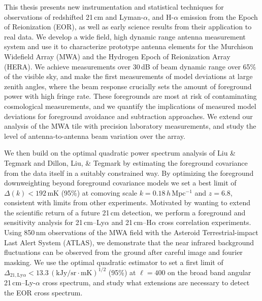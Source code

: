 % 
% 
%

This thesis presents new instrumentation and statistical techniques for observations of redshifted 21\,cm and Lyman-$\alpha$, and H-$\alpha$  emission from the Epoch of Reionization (EOR), as well as early science results from their application to real data. We develop a wide field, high dynamic range antenna measurement system and use it to characterize prototype antenna elements for the Murchison Widefield Array (MWA) and the Hydrogen Epoch of Reionization Array (HERA). We achieve measurements over 30\,dB of beam dynamic range over 65\% of the visible sky, and make the first measurements of model deviations at large zenith angles, where the beam response crucially sets the amount of foreground power with high fringe rate. These foregrounds are most at risk of contaminating cosmological measurements, and we quantify the implications of measured model deviations for foreground avoidance and subtraction approaches. We extend our analysis of the MWA tile with precision laboratory measurements, and study the level of antenna-to-antenna beam variation over the array. 

We then build on the optimal quadratic power spectrum analysis of Liu \& Tegmark and Dillon, Liu, \& Tegmark by estimating the foreground covariance from the data itself in a suitably constrained way. By optimizing the foreground downweighting beyond foreground covariance models we set a best limit of $\Delta(k) < 192$\,mK (95\%) at comoving scale $k = 0.18$\,$h$\,Mpc$^{-1}$ and $z = 6.8$, consistent with limits from other experiments. Motivated by wanting to extend the scientific return of a future 21\,cm detection, we perform a foreground and sensitivity analysis for 21\,cm--Ly$\alpha$ and 21\,cm--H$\alpha$ cross correlation experiments. Using 850\,nm observations of the MWA field with the Asteroid Terrestrial-impact Last Alert System (ATLAS), we demonstrate that the near infrared background fluctuations can be observed from the ground after careful image and fourier masking. We use the optimal quadratic estimator to set a first limit of $\Delta_{21,\text{Ly}\alpha}<13.3\,(\text{kJy/sr}\cdot \text{mK})^{1/2}$ (95\%) at $\ell=400$  on the broad band angular 21\,cm--Ly-$\alpha$ cross spectrum, and study what extensions are necessary to detect the EOR cross spectrum.
